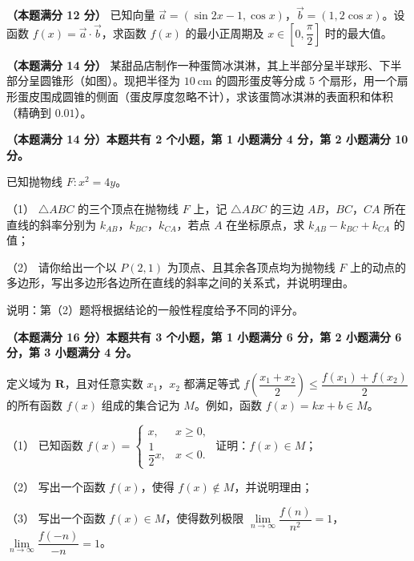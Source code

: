 \begin{question}
\textbf{（本题满分 12 分）} 已知向量 $\overrightarrow a=(\sin2x-1,\cos x)$，$\overrightarrow b=(1,2\cos x)$。设函数 $f(x)=\overrightarrow a\cdot\overrightarrow b$，求函数 $f(x)$ 的最小正周期及 $x\in\left[0,\dfrac\pi2\right]$ 时的最大值。

\Needspace{0.4\textheight}
\end{question}
\begin{question}
\textbf{（本题满分 14 分）} 某甜品店制作一种蛋筒冰淇淋，其上半部分呈半球形、下半部分呈圆锥形（如图）。现把半径为 $10\ \mathrm{cm}$ 的圆形蛋皮等分成 5 个扇形，用一个扇形蛋皮围成圆锥的侧面（蛋皮厚度忽略不计），求该蛋筒冰淇淋的表面积和体积（精确到 $0.01$）。
\nopagebreak[4]
\begin{center}\end{center}
\nopagebreak[4]
\end{question}
\begin{question}
\textbf{（本题满分 14 分）本题共有 2 个小题，第 1 小题满分 4 分，第 2 小题满分 10 分。} 

已知抛物线 $F:x^2=4y$。

（1） $\triangle ABC$ 的三个顶点在抛物线 $F$ 上，记 $\triangle ABC$ 的三边 $AB$，$BC$，$CA$ 所在直线的斜率分别为 $k_{AB}$，$k_{BC}$，$k_{CA}$，若点 $A$ 在坐标原点，求 $k_{AB}-k_{BC}+k_{CA}$ 的值；

（2） 请你给出一个以 $P(2,1)$ 为顶点、且其余各顶点均为抛物线 $F$ 上的动点的多边形，写出多边形各边所在直线的斜率之间的关系式，并说明理由。

说明：第（2）题将根据结论的一般性程度给予不同的评分。

\end{question}
\begin{question}
\textbf{（本题满分 16 分）本题共有 3 个小题，第 1 小题满分 6 分，第 2 小题满分 6 分，第 3 小题满分 4 分。} 

定义域为 $\mathbf R$，且对任意实数 $x_1$，$x_2$ 都满足等式 $f\left(\dfrac{x_1+x_2}2\right)\leqslant\dfrac{f(x_1)+f(x_2)}2$ 的所有函数 $f(x)$ 组成的集合记为 $M$。例如，函数 $f(x)=kx+b\in M$。

（1） 已知函数 $f(x)=\begin{cases}x,&x\geqslant0,\\ \dfrac12x,&x<0.\end{cases}$ 证明：$f(x)\in M$；

（2） 写出一个函数 $f(x)$，使得 $f(x)\notin M$，并说明理由；

（3） 写出一个函数 $f(x)\in M$，使得数列极限 $\lim\limits_{n\to\infty}\dfrac{f(n)}{n^2}=1$，$\lim\limits_{n\to\infty}\dfrac{f(-n)}{-n}=1$。

\end{question}
